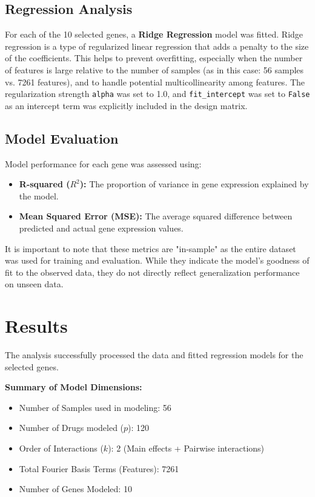 \documentclass[12pt]{article}
\begin{document}
\subsection{Regression Analysis}

For each of the 10 selected genes, a \textbf{Ridge Regression} model was fitted. Ridge regression is a type of regularized linear regression that adds a penalty to the size of the coefficients. This helps to prevent overfitting, especially when the number of features is large relative to the number of samples (as in this case: 56 samples vs. 7261 features), and to handle potential multicollinearity among features. The regularization strength \texttt{alpha} was set to 1.0, and \texttt{fit\_intercept} was set to \texttt{False} as an intercept term was explicitly included in the design matrix.

\subsection{Model Evaluation}

Model performance for each gene was assessed using:
\begin{itemize}
    \item \textbf{R-squared ($R^2$):} The proportion of variance in gene expression explained by the model.
    \item \textbf{Mean Squared Error (MSE):} The average squared difference between predicted and actual gene expression values.
\end{itemize}
It is important to note that these metrics are "in-sample" as the entire dataset was used for training and evaluation. While they indicate the model's goodness of fit to the observed data, they do not directly reflect generalization performance on unseen data.

\section{Results}

The analysis successfully processed the data and fitted regression models for the selected genes.

\textbf{Summary of Model Dimensions:}
\begin{itemize}
    \item Number of Samples used in modeling: 56
    \item Number of Drugs modeled ($p$): 120
    \item Order of Interactions ($k$): 2 (Main effects + Pairwise interactions)
    \item Total Fourier Basis Terms (Features): 7261
    \item Number of Genes Modeled: 10
\end{itemize}
\end{document}
